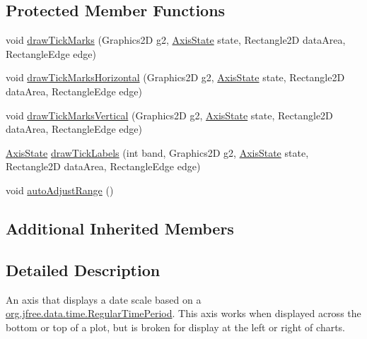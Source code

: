 \subsection*{Protected Member Functions}
\begin{DoxyCompactItemize}
\item 
void \mbox{\hyperlink{classorg_1_1jfree_1_1chart_1_1axis_1_1_period_axis_a3b3291d32d42b52c7ca5610e3df1465c}{draw\+Tick\+Marks}} (Graphics2D g2, \mbox{\hyperlink{classorg_1_1jfree_1_1chart_1_1axis_1_1_axis_state}{Axis\+State}} state, Rectangle2D data\+Area, Rectangle\+Edge edge)
\item 
void \mbox{\hyperlink{classorg_1_1jfree_1_1chart_1_1axis_1_1_period_axis_a9877ab631564d8379366dc5c69269766}{draw\+Tick\+Marks\+Horizontal}} (Graphics2D g2, \mbox{\hyperlink{classorg_1_1jfree_1_1chart_1_1axis_1_1_axis_state}{Axis\+State}} state, Rectangle2D data\+Area, Rectangle\+Edge edge)
\item 
void \mbox{\hyperlink{classorg_1_1jfree_1_1chart_1_1axis_1_1_period_axis_a173b93fe490a4fa249f83a26bf519605}{draw\+Tick\+Marks\+Vertical}} (Graphics2D g2, \mbox{\hyperlink{classorg_1_1jfree_1_1chart_1_1axis_1_1_axis_state}{Axis\+State}} state, Rectangle2D data\+Area, Rectangle\+Edge edge)
\item 
\mbox{\hyperlink{classorg_1_1jfree_1_1chart_1_1axis_1_1_axis_state}{Axis\+State}} \mbox{\hyperlink{classorg_1_1jfree_1_1chart_1_1axis_1_1_period_axis_af3e160e53a37ece6fefb0558edb7a127}{draw\+Tick\+Labels}} (int band, Graphics2D g2, \mbox{\hyperlink{classorg_1_1jfree_1_1chart_1_1axis_1_1_axis_state}{Axis\+State}} state, Rectangle2D data\+Area, Rectangle\+Edge edge)
\item 
void \mbox{\hyperlink{classorg_1_1jfree_1_1chart_1_1axis_1_1_period_axis_a23d550b1437fe5bfee1f77e2cafed044}{auto\+Adjust\+Range}} ()
\end{DoxyCompactItemize}
\subsection*{Additional Inherited Members}


\subsection{Detailed Description}
An axis that displays a date scale based on a \mbox{\hyperlink{classorg_1_1jfree_1_1data_1_1time_1_1_regular_time_period}{org.\+jfree.\+data.\+time.\+Regular\+Time\+Period}}. This axis works when displayed across the bottom or top of a plot, but is broken for display at the left or right of charts. 

